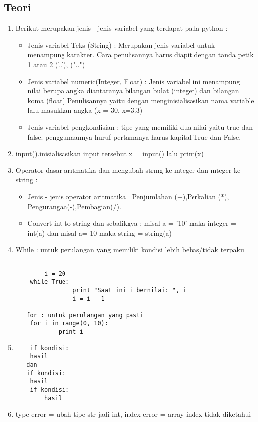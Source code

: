 \subsection{Teori}
\begin{enumerate}
	\item Berikut merupakan jenis - jenis variabel yang terdapat pada python : \begin{itemize}	
	\item Jenis variabel Teks (String) : Merupakan jenis variabel untuk menampung karakter. Cara penulisannya harus diapit dengan tanda petik 1 atau 2 ('..'), ("..")

   \item Jenis variabel numeric(Integer, Float) : Jenis variabel ini menampung nilai berupa angka diantaranya bilangan bulat (integer) dan bilangan koma (float)  Penulisannya yaitu dengan menginisialisasikan nama
   variable lalu masukkan angka (x = 30, x=3.3)

   \item Jenis variabel pengkondisian : tipe yang memiliki dua nilai yaitu true dan false. penggunaannya huruf pertamanya harus kapital True dan False.
   \end{itemize}
   \item input().inisialisasikan input tersebut x = input() lalu print(x)

   \item Operator dasar aritmatika dan mengubah string ke integer dan integer ke string : 
\begin{itemize}
\item Jenis - jenis operator aritmatika : Penjumlahan (+),Perkalian (*), Pengurangan(-),Pembagian(/).
\item Convert int to string dan sebaliknya : misal a = '10' maka integer = int(a) dan misal a= 10 maka string = string(a)
\end{itemize}

   \item While : untuk perulangan yang memiliki kondisi lebih bebas/tidak terpaku

   \begin{verbatim}

     	i = 20
	while True:
        		print "Saat ini i bernilai: ", i
        		i = i - 1
   
   for : untuk perulangan yang pasti
	for i in range(0, 10):
    		print i
    \end{verbatim}
    \item 
    \begin{verbatim}
    if kondisi:
	hasil
   dan
   if kondisi:
	hasil
	if kondisi:
	    hasil
	\end{verbatim}
	\item type error = ubah tipe str jadi int, index error = array index tidak diketahui


\end{enumerate}
